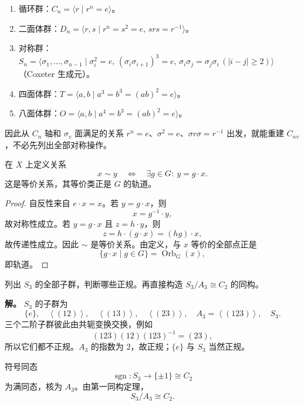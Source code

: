 \begin{enumerate}[label=(\arabic*),leftmargin=2.5em]
\item 循环群：$C_n=\langle r\mid r^n=e\rangle$。
\item 二面体群：$D_n=\langle r,s\mid r^n=s^2=e,\,srs=r^{-1}\rangle$。
\item 对称群：$S_n=\langle\sigma_1,\dots,\sigma_{n-1}\mid\sigma_i^2=e,\,(\sigma_i\sigma_{i+1})^3=e,\,\sigma_i\sigma_j=\sigma_j\sigma_i\,(|i-j|\ge2)\rangle$（Coxeter 生成元）。
\item 四面体群：$T=\langle a,b\mid a^3=b^3=(ab)^2=e\rangle$。
\item 八面体群：$O=\langle a,b\mid a^4=b^3=(ab)^2=e\rangle$。
\end{enumerate}


\par\medskip
\par\medskip

因此从 $C_n$ 轴和 $\sigma_v$ 面满足的关系 $r^n=e$、$\sigma^2=e$、$\sigma r\sigma=r^{-1}$ 出发，就能重建 $C_{nv}$，不必先列出全部对称操作。


\par
\begin{proposition}[轨道是等价类]
在 $X$ 上定义关系
\[
x\sim y
\quad\Longleftrightarrow\quad
\exists g\in G:\ y=g\cdot x.
\]
这是等价关系，其等价类正是 $G$ 的轨道。
\end{proposition}

\begin{proof}
自反性来自 $e\cdot x=x$。若 $y=g\cdot x$，则
\[
x=g^{-1}\cdot y,
\]
故对称性成立。若 $y=g\cdot x$ 且 $z=h\cdot y$，则
\[
z=h\cdot(g\cdot x)=(hg)\cdot x,
\]
故传递性成立。因此 $\sim$ 是等价关系。由定义，与 $x$ 等价的全部点正是
\[
\{g\cdot x\mid g\in G\}=\operatorname{Orb}_G(x),
\]
即轨道。
\end{proof}
\par

\par
\begin{workedexample}[$S_3$ 的子群与正规子群]
列出 $S_3$ 的全部子群，判断哪些正规。再直接构造 $S_3/A_3\cong C_2$ 的同构。

\textbf{解。} $S_3$ 的子群为
\[
\{e\},\quad
\left\langle (12)\right\rangle,\quad
\left\langle (13)\right\rangle,\quad
\left\langle (23)\right\rangle,\quad
A_3=\left\langle (123)\right\rangle,\quad
S_3.
\]
三个二阶子群彼此由共轭变换交换，例如
\[
(123)(12)(123)^{-1}=(23),
\]
所以它们都不正规。$A_3$ 的指数为 $2$，故正规；$\{e\}$ 与 $S_3$ 当然正规。

符号同态
\[
\operatorname{sgn}:S_3\to\{\pm1\}\cong C_2
\]
为满同态，核为 $A_3$。由第一同构定理，
\[
S_3/A_3\cong C_2.
\]
\end{workedexample}
\par
